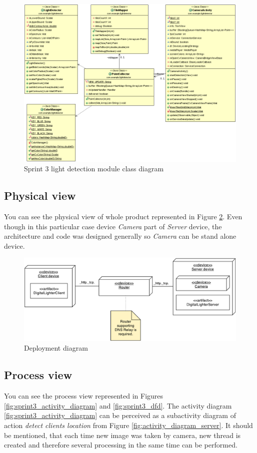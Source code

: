 \begin{figure}[h]
	\centering
		\includegraphics[width=16.2cm]{sprint3/sprint3.png}
	\caption{Sprint 3 light detection module class diagram}
	\label{fig:class_diagram_sprint3}
\end{figure}

\subsection{Physical view}
You can see the physical view of whole product represented in Figure \ref{fig:sprint3_deployment_diagram}.
Even though in this particular case device \emph{Camera} part of \emph{Server} device, the architecture and code was designed generally so \emph{Camera} can be stand alone device.

\begin{figure}[h]
	\centering
		\includegraphics[width=15cm]{images/deployment-diagram-sprint3}
	\caption{Deployment diagram}
	\label{fig:sprint3_deployment_diagram}
\end{figure}

\subsection{Process view}
You can see the process view represented in Figures \ref{fig:sprint3_activity_diagram} and \ref{fig:sprint3_dfd}. The activity diagram \ref{fig:sprint3_activity_diagram} can be perceived as a subactivity diagram of action \emph{detect clients location} from Figure \ref{fig:activity_diagram_server}.
It should be mentioned, that each time new image was taken by camera, new thread is created and therefore several processing in the same time can be performed.


